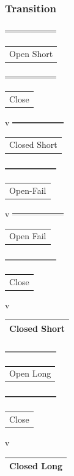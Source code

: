 \documentclass[11pt]{article}
\begin{document}
\subsubsection{Transition}
\label{sec:org6c0abd6}
\sout{------------------}
\begin{center}
\begin{tabular}{l}
Open Short\\[0pt]
\end{tabular}
\end{center}
\sout{------------------}
\begin{center}
\begin{tabular}{l}
Close\\[0pt]
\end{tabular}
\end{center}
v
\sout{------------------}
\begin{center}
\begin{tabular}{l}
Closed Short\\[0pt]
\end{tabular}
\end{center}
\sout{------------------}
\begin{center}
\begin{tabular}{l}
Open-Fail\\[0pt]
\end{tabular}
\end{center}
v
\sout{------------------}
\begin{center}
\begin{tabular}{l}
Open Fail\\[0pt]
\end{tabular}
\end{center}
\sout{------------------}
\begin{center}
\begin{tabular}{l}
Close\\[0pt]
\end{tabular}
\end{center}
v
\begin{center}
\begin{tabular}{|l|}
\hline
Closed Short \\
\hline
\end{tabular}
\end{center}

\sout{------------------}
\begin{center}
\begin{tabular}{l}
Open Long\\[0pt]
\end{tabular}
\end{center}
\sout{------------------}
\begin{center}
\begin{tabular}{l}
Close\\[0pt]
\end{tabular}
\end{center}
v
\begin{center}
\begin{tabular}{|l|}
\hline
Closed Long \\
\hline
\end{tabular}
\end{center}
\end{document}
